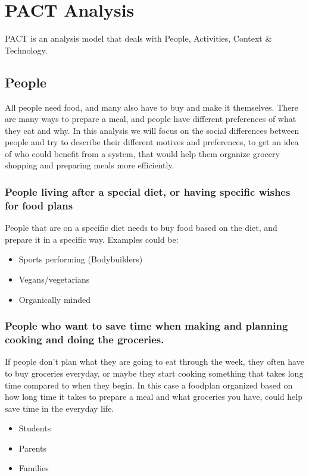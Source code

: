 \section{PACT Analysis}
PACT is an analysis model that deals with People, Activities, Context \& Technology.

\subsection{People}
All people need food, and many also have to buy and make it themselves. There are many ways to prepare a meal, and people have different preferences of what they eat and why. In this analysis we will focus on the social differences between people and try to describe their different motives and preferences, to get an idea of who could benefit from a system, that would help them organize grocery shopping and preparing meals more efficiently.

\subsubsection{People living after a special diet, or having specific wishes for food plans}
People that are on a specific diet needs to buy food based on the diet, and prepare it in a specific way.
Examples could be:
\begin{itemize}
\item Sports performing (Bodybuilders)
\item Vegans/vegetarians
\item Organically minded
\end{itemize}

\subsubsection{People who want to save time when making and planning cooking and doing the groceries.} 
If people don't plan what they are going to eat through the week, they often have to buy groceries everyday, or maybe they start cooking something that takes long time compared to when they begin. In this case a foodplan organized based on how long time it takes to prepare a meal and what groceries you have, could help save time in the everyday life.
\begin{itemize}
\item Students
\item Parents
\item Families
\end{itemize}

